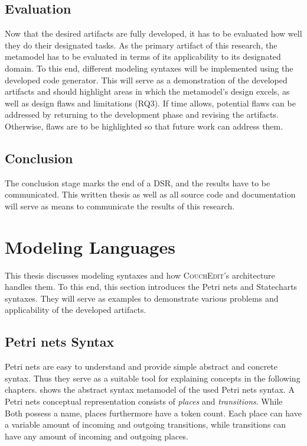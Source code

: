 \subsection{Evaluation}
Now that the desired artifacts are fully developed, it has to be evaluated how well they do their designated tasks. As the primary artifact of this research, the metamodel has to be evaluated in terms of its applicability to its designated domain. To this end, different modeling syntaxes will be implemented using the developed code generator. This will serve as a demonstration of the developed artifacts and should highlight areas in which the metamodel's design excels, as well as design flaws and limitations (RQ3). If time allows, potential flaws can be addressed by returning to the development phase and revising the artifacts. Otherwise, flaws are to be highlighted so that future work can address them.

\subsection{Conclusion}
The conclusion stage marks the end of a DSR, and the results have to be communicated. This written thesis as well as all source code and documentation will serve as means to communicate the results of this research.


\section{Modeling Languages}
\label{sec:modeling-languages}
This thesis discusses modeling syntaxes and how \textsc{CouchEdit}'s architecture handles them. To this end, this section introduces the Petri nets and Statecharts syntaxes. They will serve as examples to demonstrate various problems and applicability of the developed artifacts. 

\subsection{Petri nets Syntax}
\label{sec:petrinets}
Petri nets are easy to understand and provide simple abstract and concrete syntax. Thus they serve as a suitable tool for explaining concepts in the following chapters.  shows the abstract syntax metamodel of the used Petri nets syntax. A Petri nets conceptual representation consists of \emph{places} and \emph{transitions}. While Both possess a name, places furthermore have a token count. Each place can have a variable amount of incoming and outgoing transitions, while transitions can have any amount of incoming and outgoing places. 

